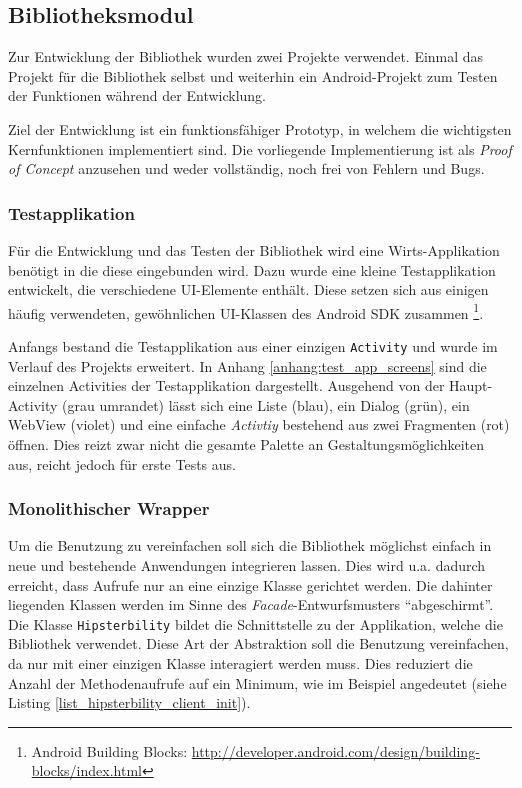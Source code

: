 \subsection{Bibliotheksmodul}
Zur Entwicklung der Bibliothek wurden zwei Projekte verwendet. 
Einmal das Projekt für die Bibliothek selbst und weiterhin ein Android-Projekt zum Testen der Funktionen während der Entwicklung. 

Ziel der Entwicklung ist ein funktionsfähiger Prototyp, in welchem die wichtigsten Kernfunktionen implementiert sind.
Die vorliegende Implementierung ist als \emph{Proof of Concept} anzusehen und weder vollständig, noch frei von Fehlern und Bugs.

\subsubsection{Testapplikation}
Für die Entwicklung und das Testen der Bibliothek wird eine Wirts-Applikation benötigt in die diese eingebunden wird.
Dazu wurde eine kleine Testapplikation entwickelt, die verschiedene \ac{UI}-Elemente enthält.
Diese setzen sich aus einigen häufig verwendeten, gewöhnlichen \ac{UI}-Klassen des Android SDK zusammen \footnote{Android Building Blocks: \url{http://developer.android.com/design/building-blocks/index.html}}.

Anfangs bestand die Testapplikation aus einer einzigen \texttt{Activity} und wurde im Verlauf des Projekts erweitert.
In Anhang \ref{anhang:test_app_screens} sind die einzelnen Activities der Testapplikation dargestellt.
Ausgehend von der Haupt-Activity (grau umrandet) lässt sich eine Liste (blau), ein Dialog (grün), ein WebView (violet) und eine einfache \emph{Activtiy} bestehend aus zwei Fragmenten (rot) öffnen.
Dies reizt zwar nicht die gesamte Palette an Gestaltungsmöglichkeiten aus, reicht jedoch für erste Tests aus.

\subsubsection{Monolithischer Wrapper\label{sec:monolithischer_wrapper}}
Um die Benutzung zu vereinfachen soll sich die Bibliothek möglichst einfach in neue und bestehende Anwendungen integrieren lassen.
Dies wird u.a. dadurch erreicht, dass Aufrufe nur an eine einzige Klasse gerichtet werden.
Die dahinter liegenden Klassen werden im Sinne des \emph{Facade}-Entwurfsmusters \cite[vgl.][40\psq]{designpattern} \enquote{abgeschirmt}.
Die Klasse \texttt{Hipsterbility} bildet die Schnittstelle zu der Applikation, welche die Bibliothek verwendet.
Diese Art der Abstraktion soll die Benutzung vereinfachen, da nur mit einer einzigen Klasse interagiert werden muss. 
Dies reduziert die Anzahl der Methodenaufrufe auf ein Minimum, wie im Beispiel angedeutet (siehe Listing \ref{list_hipsterbility_client_init}).

